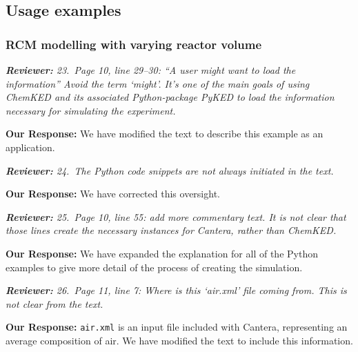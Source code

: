 \documentclass[a4paper,10pt]{elsarticle}
\newenvironment{reviewer}{\vspace{0.5\baselineskip}\begingroup\itshape\textbf{Reviewer:}}{\endgroup}
\newenvironment{response}{\textbf{Our Response:}}{\vspace{0.5\baselineskip}}
\begin{document}
\subsection*{Usage examples}
\subsubsection*{RCM modelling with varying reactor volume}

\begin{reviewer}
    23.~Page 10, line 29--30: ``A user might want to load the information'' Avoid the term `might'.
    It's one of the main goals of using ChemKED and its associated Python-package PyKED to load the
    information necessary for simulating the experiment.
\end{reviewer}

\begin{response}
    We have modified the text to describe this example as an application.
\end{response}

\begin{reviewer}
    24.~The Python code snippets are not always initiated in the text.
\end{reviewer}

\begin{response}
    We have corrected this oversight.
\end{response}

\begin{reviewer}
    25.~Page 10, line 55: add more commentary text. It is not clear that those lines create the
    necessary instances for Cantera, rather than ChemKED.
\end{reviewer}

\begin{response}
    We have expanded the explanation for all of the Python examples to give more detail of the
    process of creating the simulation.
\end{response}

\begin{reviewer}
    26.~Page 11, line 7: Where is this `air.xml' file coming from. This is not clear from the text.
\end{reviewer}

\begin{response}
    \verb|air.xml| is an input file included with Cantera, representing an average composition of
    air. We have modified the text to include this information.
\end{response}
\end{document}
